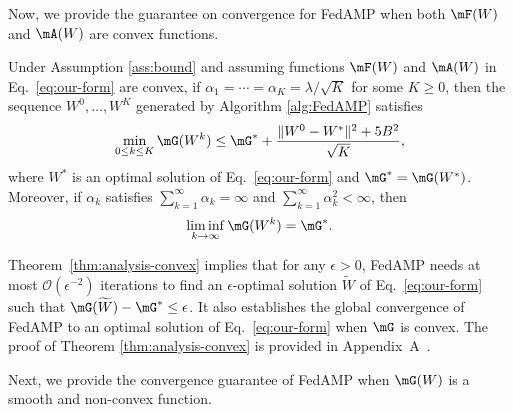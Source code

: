 Now, we provide the guarantee on convergence for FedAMP when both $\mF(W)$ and $\mA(W)$ are convex functions.
\begin{thm}
\label{thm:analysis-convex}
Under Assumption \ref{ass:bound} and assuming functions $\mF(W)$ and $\mA(W)$ in Eq.~\eqref{eq:our-form} are convex, if $\alpha_{1} = \cdots = \alpha_K = \lambda/\sqrt{K}$ for some $K\geq 0$, then the sequence $W^0, \ldots, W^K$ generated by Algorithm \ref{alg:FedAMP} satisfies
\begin{equation}\nonumber
\min_{0\leq k\leq K} \mG(W^k) \leq \mG^* + \frac{\|W^0 - W^*\|^2 + 5B^2}{\sqrt{K}},
\end{equation}
where $W^*$ is an optimal solution of Eq.~\eqref{eq:our-form} and $\mG^*= \mG(W^*)$. Moreover, if $\alpha_k$ satisfies $\sum_{k=1}^\infty\alpha_k = \infty$ and $\sum_{k=1}^\infty\alpha_k^2<\infty$, then %
\begin{equation}
\nonumber
\liminf_{k\rightarrow\infty} \mG(W^k) = \mG^*.
\end{equation}
\end{thm}

Theorem~\ref{thm:analysis-convex} implies that for any $\epsilon>0$, FedAMP needs at most $\mathcal{O}(\epsilon^{-2})$ iterations to find an $\epsilon$-optimal solution $\widetilde{W}$ of Eq.~\eqref{eq:our-form} such that $\mG(\widetilde{W}) - \mG^* \leq \epsilon$. It also establishes the global convergence of FedAMP to an optimal solution of Eq.~\eqref{eq:our-form} when $\mG$ is convex. The proof of Theorem \ref{thm:analysis-convex} is provided in Appendix~A~\cite{huang2020personalized}. 



Next, we provide the convergence guarantee of {FedAMP} when $\mG(W)$ is a smooth and non-convex function. 

